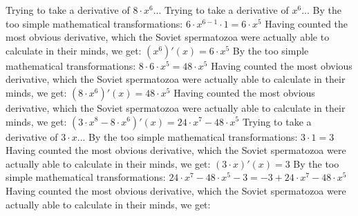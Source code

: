 \documentclass[a4paper, 12pt]{article}
\begin{document}
\newline
Trying to take a derivative of ${{8} \cdot {{x} ^ {6}}}$...\newline
\newline
Trying to take a derivative of ${{x} ^ {6}}$...\newline
\newline
By the too simple mathematical transformations:
 ${{{6} \cdot {{x} ^ {{6} - {1}}}} \cdot {1}} = {{6} \cdot {{x} ^ {5}}}$ 
 \newline
 \newline 
Having counted the most obvious derivative, which the Soviet spermatozoa were actually able to calculate in their minds, we get:
$({{x} ^ {6}})'(x) = {{6} \cdot {{x} ^ {5}}}$\newline
\newline
By the too simple mathematical transformations:
 ${{8} \cdot {{6} \cdot {{x} ^ {5}}}} = {{48} \cdot {{x} ^ {5}}}$ 
 \newline
 \newline 
Having counted the most obvious derivative, which the Soviet spermatozoa were actually able to calculate in their minds, we get:
$({{8} \cdot {{x} ^ {6}}})'(x) = {{48} \cdot {{x} ^ {5}}}$\newline
\newline
Having counted the most obvious derivative, which the Soviet spermatozoa were actually able to calculate in their minds, we get:
$({{{3} \cdot {{x} ^ {8}}} - {{8} \cdot {{x} ^ {6}}}})'(x) = {{{24} \cdot {{x} ^ {7}}} - {{48} \cdot {{x} ^ {5}}}}$\newline
\newline
Trying to take a derivative of ${{3} \cdot {x}}$...\newline
\newline
By the too simple mathematical transformations:
 ${{3} \cdot {1}} = {3}$ 
 \newline
 \newline 
Having counted the most obvious derivative, which the Soviet spermatozoa were actually able to calculate in their minds, we get:
$({{3} \cdot {x}})'(x) = {3}$\newline
\newline
By the too simple mathematical transformations:
 ${{{{24} \cdot {{x} ^ {7}}} - {{48} \cdot {{x} ^ {5}}}} - {3}} = {{-3} + {{{24} \cdot {{x} ^ {7}}} - {{48} \cdot {{x} ^ {5}}}}}$ 
 \newline
 \newline 
Having counted the most obvious derivative, which the Soviet spermatozoa were actually able to calculate in their minds, we get:
\end{document}
